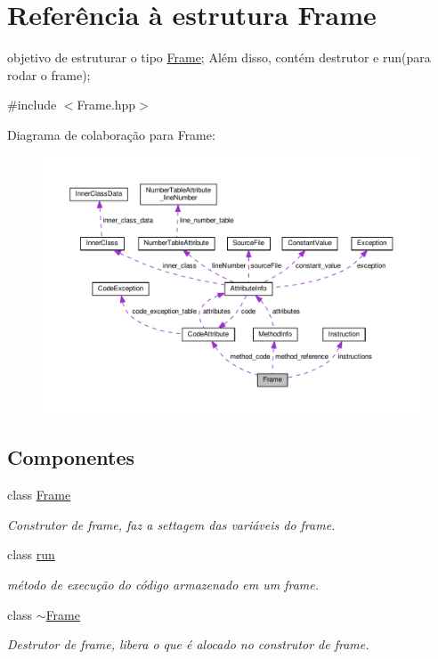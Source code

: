 \hypertarget{struct_frame}{}\section{Referência à estrutura Frame}
\label{struct_frame}


objetivo de estruturar o tipo \hyperlink{struct_frame}{Frame}; Além disso, contém destrutor e run(para rodar o frame);  




{\ttfamily \#include $<$Frame.\+hpp$>$}



Diagrama de colaboração para Frame\+:
\nopagebreak
\begin{figure}[H]
\begin{center}
\leavevmode
\includegraphics[width=350pt]{struct_frame__coll__graph}
\end{center}
\end{figure}
\subsection*{Componentes}
\begin{DoxyCompactItemize}
\item 
class \hyperlink{class_frame_1_1_frame}{Frame}
\begin{DoxyCompactList}\small\item\em Construtor de frame, faz a settagem das variáveis do frame. \end{DoxyCompactList}\item 
class \hyperlink{class_frame_1_1run}{run}
\begin{DoxyCompactList}\small\item\em método de execução do código armazenado em um frame. \end{DoxyCompactList}\item 
class \hyperlink{class_frame_1_1~_frame}{$\sim$\+Frame}
\begin{DoxyCompactList}\small\item\em Destrutor de frame, libera o que é alocado no construtor de frame. \end{DoxyCompactList}\end{DoxyCompactItemize}
